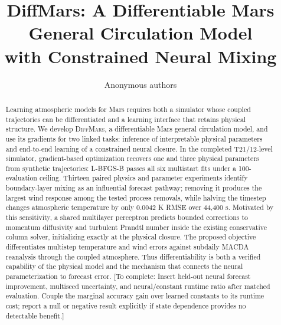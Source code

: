 \documentclass{article}
\title{DiffMars: A Differentiable Mars General Circulation Model\\
with Constrained Neural Mixing}
\author{Anonymous authors}
\newcommand{\model}{\textsc{DiffMars}}
\newcommand{\pending}[1]{\textcolor{blue!65!black}{[To complete: #1]}}
\begin{document}
\maketitle

\begin{abstract}
Learning atmospheric models for Mars requires both a simulator whose coupled
trajectories can be differentiated and a learning interface that retains
physical structure. We develop \model, a differentiable Mars general
circulation model, and use its gradients for two linked tasks: inference of
interpretable physical parameters and end-to-end learning of a constrained
neural closure. In the completed T21/12-level simulator, gradient-based
optimization recovers one and three physical parameters from synthetic
trajectories: L-BFGS-B passes all six multistart fits under a 100-evaluation
ceiling. Thirteen paired physics and parameter experiments identify
boundary-layer mixing as an influential forecast pathway; removing it produces
the largest wind response among the tested process removals, while halving the
timestep changes atmospheric temperature by only 0.0042 K RMSE over 44,400 s.
Motivated by this sensitivity, a shared multilayer perceptron predicts bounded
corrections to momentum diffusivity and turbulent Prandtl number inside the
existing conservative column solver, initializing exactly at the physical
closure. The proposed objective differentiates multistep temperature and wind
errors against subdaily MACDA reanalysis through the coupled atmosphere. Thus
differentiability is both a verified capability of the physical model and the
mechanism that connects the neural parameterization to forecast error.
\pending{Insert held-out neural forecast improvement, multiseed uncertainty,
and neural/constant runtime ratio after matched evaluation. Couple the marginal
accuracy gain over learned constants to its runtime cost; report a null or
negative result explicitly if state dependence provides no detectable benefit.}
\end{abstract}
\end{document}
